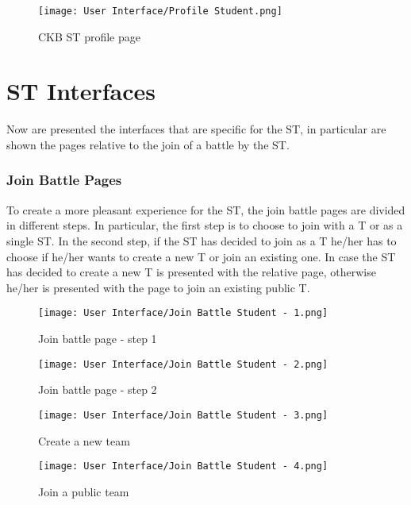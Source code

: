 \begin{figure}[H]
  \centering
  \texttt{[image: User Interface/Profile Student.png]}
  \caption{CKB ST profile page}
  \label{fig:ST_profile}
\end{figure}

\newpage

\section*{ST Interfaces}
\label{s:ST_interface}%

Now are presented the interfaces that are specific for the ST, in particular are shown the pages relative to the join of a battle by the ST.

\subsubsection*{Join Battle Pages}
\label{ss:join_battle_pages}%
To create a more pleasant experience for the ST, the join battle pages are divided in different steps. In particular, the first step is to choose to join with a T or as a single ST. In the second step, if the ST has decided to join as a T he/her has to choose if he/her wants to create a new T or join an existing one. In case the ST has decided to create a new T is presented with the relative page, otherwise he/her is presented with the page to join an existing public T.

\begin{figure}[H]
  \centering
  \texttt{[image: User Interface/Join Battle Student - 1.png]}
  \caption{Join battle page - step 1}
  \label{fig:join_battle1}
\end{figure}

\begin{figure}[H]
  \centering
  \texttt{[image: User Interface/Join Battle Student - 2.png]}
  \caption{Join battle page - step 2}
  \label{fig:join_battle2}
\end{figure}

\begin{figure}[H]
  \centering
  \texttt{[image: User Interface/Join Battle Student - 3.png]}
  \caption{Create a new team}
  \label{fig:join_battle3}
\end{figure}

\begin{figure}[H]
  \centering
  \texttt{[image: User Interface/Join Battle Student - 4.png]}
  \caption{Join a public team}
  \label{fig:join_battle4}
\end{figure}

